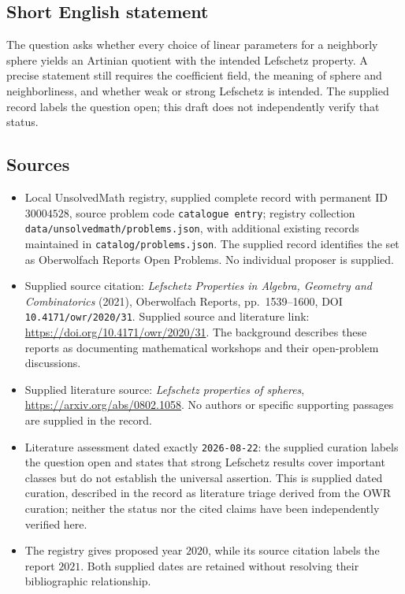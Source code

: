 \documentclass[11pt]{article}
\begin{document}
\subsection{Short English statement}
The question asks whether every choice of linear parameters for a neighborly sphere yields an Artinian quotient with the intended Lefschetz property. A precise statement still requires the coefficient field, the meaning of sphere and neighborliness, and whether weak or strong Lefschetz is intended. The supplied record labels the question open; this draft does not independently verify that status.
\subsection{Sources}
\begin{itemize}
\item Local UnsolvedMath registry, supplied complete record with permanent ID \(30004528\), source problem code \texttt{catalogue entry}; registry collection \texttt{data/unsolvedmath/problems.json}, with additional existing records maintained in \texttt{catalog/problems.json}. The supplied record identifies the set as Oberwolfach Reports Open Problems. No individual proposer is supplied.
\item Supplied source citation: \emph{Lefschetz Properties in Algebra, Geometry and Combinatorics} (2021), Oberwolfach Reports, pp.~1539--1600, DOI \texttt{10.4171/owr/2020/31}. Supplied source and literature link: \url{https://doi.org/10.4171/owr/2020/31}. The background describes these reports as documenting mathematical workshops and their open-problem discussions.
\item Supplied literature source: \emph{Lefschetz properties of spheres}, \url{https://arxiv.org/abs/0802.1058}. No authors or specific supporting passages are supplied in the record.
\item Literature assessment dated exactly \texttt{2026-08-22}: the supplied curation labels the question open and states that strong Lefschetz results cover important classes but do not establish the universal assertion. This is supplied dated curation, described in the record as literature triage derived from the OWR curation; neither the status nor the cited claims have been independently verified here.
\item The registry gives proposed year \(2020\), while its source citation labels the report \(2021\). Both supplied dates are retained without resolving their bibliographic relationship.
\end{itemize}
\end{document}
